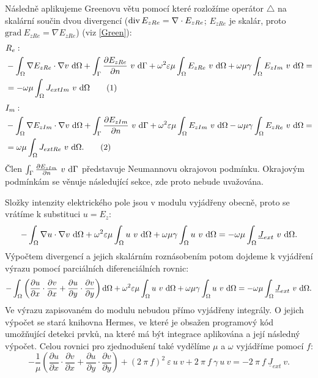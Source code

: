 \documentclass[12pt,a4paper,oneside]{article}
\numberwithin{equation}{section} %
\numberwithin{figure}{section} %
\numberwithin{table}{section} %
\newcommand{\faz}[1]{{\underline{#1}}} %
\newcommand{\grad}{\mathrm{grad}\ }
\newcommand\numberthis{\addtocounter{equation}{1}\tag{\theequation}}
\begin{document}
Následně aplikujeme Greenovu větu pomocí které rozložíme operátor $\triangle$ na skalární součin dvou divergencí ($\mathop{\rm div}\nolimits E _{zRe} = \nabla \cdot E _{zRe}$; $E _{zRe}$ je skalár, proto $\grad E _{zRe} = \nabla E _{zRe}$) (viz \ref{Green}):
\begin{align*}
&R_e:
\\
&- \int _{\Omega} \nabla E _{zRe} \cdot \nabla v ~ \ud \Omega + \int _{\Gamma} \frac{\partial E _{zRe}}{\partial n} ~ v ~ \ud \Gamma + \omega ^2 \varepsilon \mu \int _{\Omega} E _{zRe} ~ v ~ \ud \Omega + \omega \mu \gamma \int _{\Omega} E _{zIm} ~ v ~ \ud \Omega = 
\\
&= - \omega \mu \int _{\Omega} J _{extIm} ~ v ~ \ud \Omega
\numberthis
\end{align*}
\begin{align*}
&I_m:
\\
&- \int _{\Omega} \nabla E _{zIm} \cdot \nabla v ~ \ud \Omega + \int _{\Gamma} \frac{\partial E _{zIm}}{\partial n} ~ v ~ \ud \Gamma + \omega ^2 \varepsilon \mu \int _{\Omega} E _{zIm} ~ v ~ \ud \Omega - \omega \mu \gamma \int _{\Omega} E _{zRe} ~ v ~ \ud \Omega = 
\\
&= \omega \mu \int _{\Omega} J _{extRe} ~ v ~ \ud \Omega .
\numberthis
\end{align*}
Člen $\int _{\Gamma} \frac{\partial E _{zIm}}{\partial n} ~ v ~ \mathrm{d} \Gamma$ představuje Neumannovu okrajovou podmínku. Okrajovým podmínkám se věnuje následující sekce, zde proto nebude uvažována.

Složky intenzity elektrického pole jsou v modulu vyjádřeny obecně, proto se vrátíme k substituci $u = E_z$:
\begin{equation}
- \int _{\Omega} \nabla u \cdot \nabla v ~ \ud \Omega + \omega ^2 \varepsilon \mu \int _{\Omega} u ~ v ~ \ud \Omega + \omega \mu \gamma \int _{\Omega} u ~ v ~ \ud \Omega = - \omega \mu \int _{\Omega} \faz{J} _{ext} ~ v ~ \ud \Omega .
\end{equation}
Výpočtem divergencí a jejich skalárním roznásobením potom dojdeme k vyjádření výrazu pomocí parciálních diferenciálních rovnic:
\begin{equation}
- \int _{\Omega} \left( \frac{\partial u}{\partial x} \cdot \frac{\partial v}{\partial x} + \frac{\partial u}{\partial y} \cdot \frac{\partial v}{\partial y} \right) \ud \Omega + \omega ^2 \varepsilon \mu \int _{\Omega} u ~ v ~ \ud \Omega + \omega \mu \gamma \int _{\Omega} u ~ v ~ \ud \Omega = - \omega \mu \int _{\Omega} \faz{J} _{ext} ~ v ~ \ud \Omega .
\end{equation}
Ve výrazu zapisovaném do modulu nebudou přímo vyjádřeny integrály. O jejich výpočet se stará knihovna Hermes, ve které je obsažen programový kód umožňující detekci prvků, na které má být integrace aplikována a její následný výpočet. Celou rovnici pro zjednodušení také vydělíme $\mu$ a $\omega$ vyjádříme pomocí $f$:
\begin{equation}
- \frac{1}{\mu} \left( \frac{\partial u}{\partial x} \cdot \frac{\partial v}{\partial x} + \frac{\partial u}{\partial y} \cdot \frac{\partial v}{\partial y} \right) + (2 ~ \pi ~ f) ^2 ~ \varepsilon ~ u ~ v + 2 ~ \pi ~ f ~ \gamma ~ u ~ v = - 2 ~ \pi ~ f ~ \faz{J} _{ext} ~ v .
\end{equation}
\end{document}
